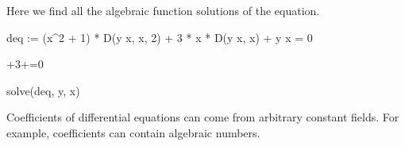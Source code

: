 {{{{{{{{\begin{xtc}
\begin{TeXOutput}
\begin{fricasmath}{3}
\end{fricasmath}
\end{TeXOutput}
\end{xtc}
\begin{xtc}
\begin{xtccomment}
Here we find all the algebraic function solutions of the equation.
\end{xtccomment}
\begin{spadsrc}
deq := (x^2 + 1) * D(y x, x, 2) + 3 * x * D(y x, x) + y x = 0 
\end{spadsrc}
\begin{TeXOutput}
\begin{fricasmath}{4}
\TIMES {}+3\TIMES {}\TIMES {}+=0%
\end{fricasmath}
\end{TeXOutput}
\end{xtc}
\begin{xtc}
\begin{xtccomment}
\end{xtccomment}
\begin{spadsrc}
solve(deq, y, x) 
\end{spadsrc}
\begin{TeXOutput}
\begin{fricasmath}{5}
%
\end{fricasmath}
\end{TeXOutput}
\end{xtc}

Coefficients of differential equations can come from arbitrary
constant fields.
For example, coefficients can contain algebraic numbers.

}}}}}}}}
